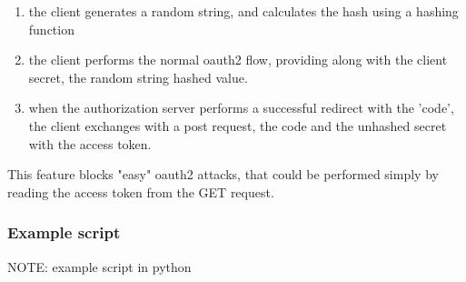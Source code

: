 \documentclass[11pt]{style}
\begin{document}
\begin{enumerate}
    \item the client generates a random string, and calculates the hash using a
        hashing function
    \item the client performs the normal oauth2 flow, providing along with the
        client secret, the random string hashed value.
    \item when the authorization server performs a successful redirect with the
        'code', the client exchanges with a post request, the code and the
        unhashed secret with the access token.
\end{enumerate}

This feature blocks "easy" oauth2 attacks, that could be performed simply by
reading the access token from the GET request.

\subsubsection{Example script}
NOTE: example script in python
\end{document}
